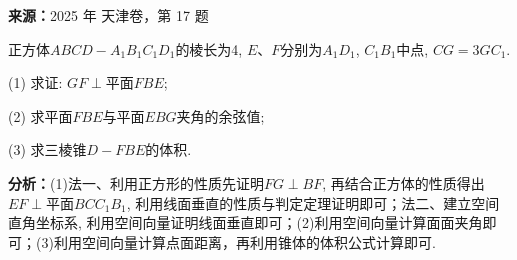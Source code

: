 \begin{question}[points=15]
\textbf{来源：}2025 年 天津卷，第 17 题\par
正方体$ABCD - A_1B_1C_1D_1$的棱长为4, $E$、$F$分别为$A_1D_1$, $C_1B_1$中点, $CG = 3GC_1$.

(1) 求证: $GF \perp$平面$FBE$;

(2) 求平面$FBE$与平面$EBG$夹角的余弦值;

(3) 求三棱锥$D - FBE$的体积.
\begin{solution}

\textbf{分析：}(1)法一、利用正方形的性质先证明$FG \perp BF$, 再结合正方体的性质得出$EF \perp$平面$BCC_1B_1$, 利用线面垂直的性质与判定定理证明即可；法二、建立空间直角坐标系, 利用空间向量证明线面垂直即可；(2)利用空间向量计算面面夹角即可；(3)利用空间向量计算点面距离，再利用锥体的体积公式计算即可.


\end{solution}
\end{question}
